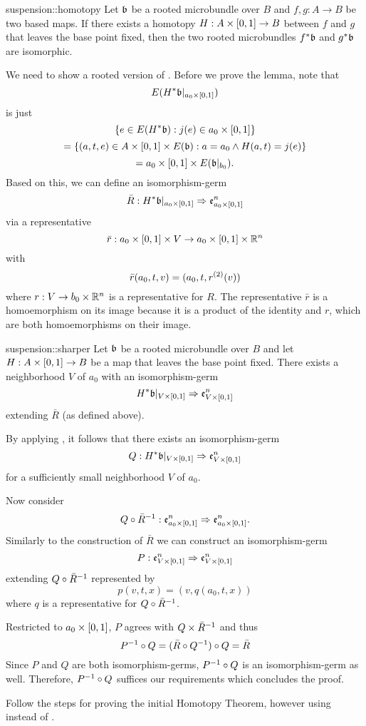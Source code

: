 \begin{mytheorem}{suspension::homotopy}
    Let $\mathfrak{b}$ be a rooted microbundle over $B$ and $f, g: A \to B$ be two based maps.
    If there exists a homotopy $H: A \times{} [0, 1] \to B$ between $f$ and $g$ that leaves the base point fixed,
    then the two rooted microbundles $f^*\mathfrak{b}$ and $g^*\mathfrak{b}$ are isomorphic.
\end{mytheorem}

\begin{myparagraph}
    We need to show a rooted version of .
    Before we prove the lemma, note that 
    \[ E(H^*\mathfrak{b}\vert_{a_0 \times{} [0, 1]}) \]
    is just
    \[ \{e \in E(H^*\mathfrak{b}):j(e) \in a_0 \times{} [0, 1]\} \]
    \[ = \{ (a, t, e) \in A \times{} [0, 1] \times E(\mathfrak{b}):a = a_0 \land H(a, t) = j(e)\} \]
    \[ = a_0 \times{} [0, 1] \times E(\mathfrak{b}\vert_{b_0}). \]
    Based on this, we can define an isomorphism-germ
    \[ \bar{R}: H^*\mathfrak{b}\vert_{a_0 \times{} [0, 1]} \Rightarrow{} \mathfrak{e}^{n}_{a_0 \times{} [0, 1]} \]
    via a representative
    \[ \bar{r}: a_0 \times{} [0, 1] \times V \to a_0 \times{} [0, 1] \times \mathbb{R}^n \]
    with
    \[ \bar{r}(a_0, t, v) = (a_0, t, r^{(2)}(v) )\]
    where $r: V \to b_0 \times \mathbb{R}^n$ is a representative for $R$.
    The representative $\bar{r}$ is a homoemorphism on its image
    because it is a product of the identity and $r$, which are both homoemorphisms on their image. 
\end{myparagraph}

\begin{mylemma}{suspension::sharper}
    Let $\mathfrak{b}$ be a rooted microbundle over $B$ and let $H: A \times{} [0, 1] \to B$ be a map that leaves the base point fixed.
    There exists a neighborhood $V$ of $a_0$ with an isomorphism-germ
    \[ H^*\mathfrak{b}\vert_{V \times{} [0, 1]} \Rightarrow{} \mathfrak{e}^{n}_{V \times{} [0, 1]} \]
    extending $\bar{R}$ (as defined above).
\end{mylemma}

\begin{myproof}
    By applying , it follows that there exists an isomorphism-germ
    \[ Q: H^*\mathfrak{b}\vert_{V \times{} [0, 1]} \Rightarrow{} \mathfrak{e}^{n}_{V \times{} [0, 1]} \]
    for a sufficiently small neighborhood $V$ of $a_0$.

    Now consider
    \[ Q \circ \bar{R}^{-1}: \mathfrak{e}^{n}_{a_0 \times{} [0, 1]} \Rightarrow{} \mathfrak{e}^{n}_{a_0 \times{} [0, 1]}. \]
    Similarly to the construction of $\bar{R}$ we can construct an isomorphism-germ
    \[ P: \mathfrak{e}^{n}_{V \times{} [0, 1]} \Rightarrow{} \mathfrak{e}^{n}_{V \times{} [0, 1]} \]
    extending $Q \circ \bar{R}^{-1}$ represented by
    \[ p(v, t, x) = (v, q(a_0, t, x)) \]
    where $q$ is a representative for $Q \circ \bar{R}^{-1}$.

    Restricted to $a_0 \times{} [0, 1]$, $P$ agrees with $Q \times \bar{R}^{-1}$ and thus
    \[ P^{-1} \circ Q = (\bar{R} \circ Q^{-1}) \circ Q = \bar{R} \]
    Since $P$ and $Q$ are both isomorphism-germs, $P^{-1} \circ Q$ is an isomorphism-germ as well.
    Therefore, $P^{-1} \circ Q$ suffices our requirements which concludes the proof.
\end{myproof}

\begin{myproof}
    Follow the steps for proving the initial Homotopy Theorem,
    however using  instead of .
\end{myproof}